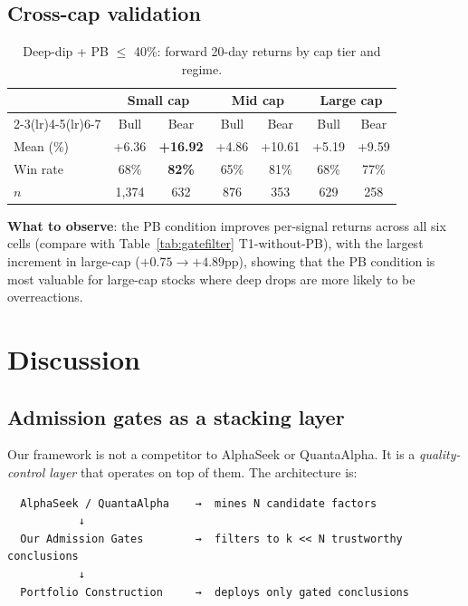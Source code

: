 \documentclass[11pt]{article}
\begin{document}
\subsection{Cross-cap validation}
\label{sec:cross}

\begin{table}[htbp]
\centering
\caption{Deep-dip + PB $\le$ 40\%: forward 20-day returns by cap tier and regime.}
\label{tab:cross}
\small
\begin{tabular}{@{}lcccccc@{}}
\toprule
 & \multicolumn{2}{c}{Small cap} & \multicolumn{2}{c}{Mid cap} & \multicolumn{2}{c}{Large cap} \\
\cmidrule(lr){2-3}\cmidrule(lr){4-5}\cmidrule(lr){6-7}
 & Bull & Bear & Bull & Bear & Bull & Bear \\
\midrule
Mean (\%) & +6.36 & \textbf{+16.92} & +4.86 & +10.61 & +5.19 & +9.59 \\
Win rate & 68\% & \textbf{82\%} & 65\% & 81\% & 68\% & 77\% \\
$n$ & 1{,}374 & 632 & 876 & 353 & 629 & 258 \\
\bottomrule
\end{tabular}
\end{table}

\textbf{What to observe}: the PB condition improves per-signal returns across
all six cells (compare with Table~\ref{tab:gatefilter} T1-without-PB), with
the largest increment in large-cap ($+0.75 \to +4.89$pp), showing that the
PB condition is most valuable for large-cap stocks where deep drops are more
likely to be overreactions.


\section{Discussion}
\label{sec:discussion}

\subsection{Admission gates as a stacking layer}

Our framework is not a competitor to AlphaSeek or QuantaAlpha. It is a
\emph{quality-control layer} that operates on top of them. The architecture
is:

\begin{verbatim}
  AlphaSeek / QuantaAlpha    →  mines N candidate factors
           ↓
  Our Admission Gates        →  filters to k << N trustworthy conclusions
           ↓
  Portfolio Construction     →  deploys only gated conclusions
\end{verbatim}
\end{document}

